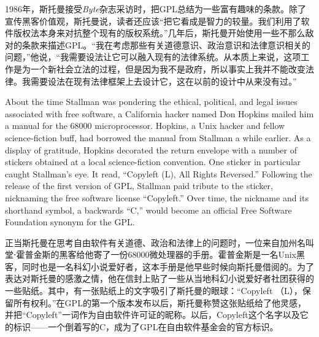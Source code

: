 \ifdefined\chs
1986年，斯托曼接受\textit{Byte}杂志采访时，把GPL总结为一些富有趣味的条款。除了宣传黑客价值观，斯托曼说，读者还应该``把它看成是智力的较量。我们利用了软件版权法本身来对抗整个现有的版权系统。''几年后，斯托曼开始使用一些不那么敌对的条款来描述GPL。``我在考虑那些有关道德意识、政治意识和法律意识相关的问题，''他说，``我需要设法让它可以融入现有的法律系统。从本质上来说，这项工作是为一个新社会立法的过程，但是因为我不是政府，所以事实上我并不能改变法律。我需要设法在现有法律框架上去设计它，这在以前的设计中从来没有过。''
\fi

\ifdefined\eng
About the time Stallman was pondering the ethical, political, and legal issues associated with free software, a California hacker named Don Hopkins mailed him a manual for the 68000 microprocessor. Hopkins, a Unix hacker and fellow science-fiction buff, had borrowed the manual from Stallman a while earlier. As a display of gratitude, Hopkins decorated the return envelope with a number of stickers obtained at a local science-fiction convention. One sticker in particular caught Stallman's eye. It read, ``Copyleft (L), All Rights Reversed.'' Following the release of the first version of GPL, Stallman paid tribute to the sticker, nicknaming the free software license ``Copyleft.'' Over time, the nickname and its shorthand symbol, a backwards ``C,'' would become an official Free Software Foundation synonym for the GPL.
\fi

\ifdefined\chs
正当斯托曼在思考自由软件有关道德、政治和法律上的问题时，一位来自加州名叫堂⋅霍普金斯的黑客给他寄了一份68000微处理器的手册。霍普金斯是一名Unix黑客，同时也是一名科幻小说爱好者，这本手册是他早些时候向斯托曼借阅的。为了表达对斯托曼的感激之情，他在信封上贴了一些从当地科幻小说爱好者社团获得的一些贴纸。其中，有一张贴纸上的文字吸引了斯托曼的眼球：``Copyleft （L），保留所有权利。''在GPL的第一个版本发布以后，斯托曼称赞这张贴纸给了他灵感，并把``Copyleft''一词作为自由软件许可证的昵称。以后，Copyleft这个名字以及它的标识——一个倒着写的C，成为了GPL在自由软件基金会的官方标识。
\fi

